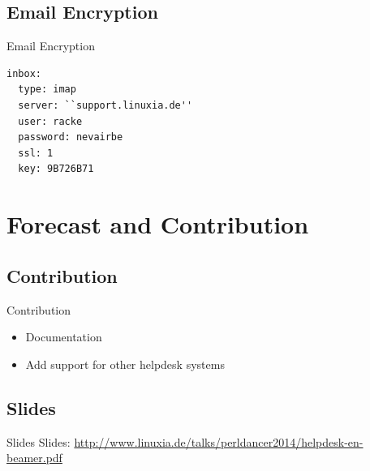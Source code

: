 \subsection{Email Encryption}
\begin{frame}[fragile]{Email Encryption}
\begin{lstlisting}
inbox:
  type: imap
  server: ``support.linuxia.de''
  user: racke
  password: nevairbe
  ssl: 1
  key: 9B726B71
\end{lstlisting}
\end{frame}

\section{Forecast and Contribution}

\subsection{Contribution}
\begin{frame}{Contribution}
\begin{itemize}
\item Documentation
\item Add support for other helpdesk systems
\end{itemize}
\end{frame}

\subsection{Slides}

\begin{frame}{Slides}
Slides:
\url{http://www.linuxia.de/talks/perldancer2014/helpdesk-en-beamer.pdf}
\end{frame}



